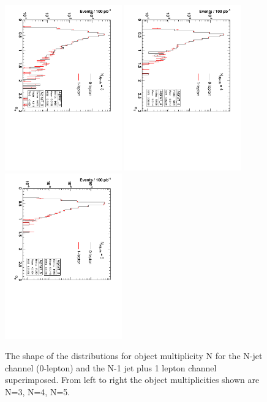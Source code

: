 \begin{figure}
\centering
\includegraphics[width=0.45\textwidth, angle=90]{Figures/AlphaT/aT_3}
\includegraphics[width=0.45\textwidth,angle=90]{Figures/AlphaT/aT_4}
\includegraphics[width=0.45\textwidth,angle=90]{Figures/AlphaT/aT_5}
\caption{\label{fig:aTnobj}The shape of the \alt distributions for object multiplicity N for the N-jet channel (0-lepton) and the N-1 jet plus 1 lepton channel superimposed. From left to right the object multiplicities shown are N=3, N=4, N=5.}
\end{figure}


